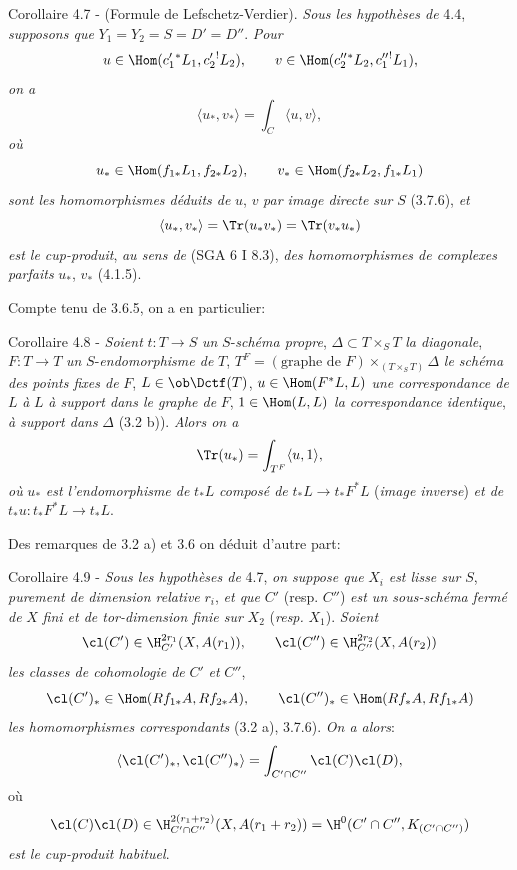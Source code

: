 \begin{statement}{Corollaire 4.7 - (Formule de Lefschetz-Verdier).}
\emph{Sous les hypothèses de} 4.4, \emph{supposons que} $Y_1=Y_2=S=D'=D''$. \emph{Pour}
\[
u\in\Hom(c_1'{}^*L_1,c_2'{}^!L_2),\qquad
v\in\Hom(c_2''{}^*L_2,c_1''{}^!L_1),
\]
\emph{on a}
\begin{equation}
\tag{4.7.1}
\langle u_*,v_*\rangle=\int_C\langle u,v\rangle,
\end{equation}
\emph{où}
\[
u_*\in\Hom(f_{1*}L_1,f_{2*}L_2),\qquad
v_*\in\Hom(f_{2*}L_2,f_{1*}L_1)
\]
\emph{sont les homomorphismes déduits de} $u$, $v$ \emph{par image directe sur} $S$ (3.7.6), \emph{et}
\[
\langle u_*,v_*\rangle=\Tr(u_*v_*)=\Tr(v_*u_*)
\]
\emph{est le cup-produit}, \emph{au sens de} (SGA 6 I 8.3), \emph{des homomorphismes de complexes parfaits} $u_*$, $v_*$ (4.1.5).
\end{statement}

Compte tenu de 3.6.5, on a en particulier:

\begin{statement}{Corollaire 4.8 -}
\emph{Soient} $t:T\longrightarrow S$ \emph{un} $S$-\emph{schéma propre}, $\Delta\subset T\times_S T$ \emph{la diagonale}, $F:T\longrightarrow T$ \emph{un} $S$-\emph{endomorphisme de} $T$, $T^F=(\text{graphe de }F)\times_{(T\times_S T)}\Delta$ \emph{le schéma des points fixes de} $F$, $L\in\ob\Dctf(T)$, $u\in\Hom(F^*L,L)$ \emph{une correspondance de} $L$ \emph{à} $L$ \emph{à support dans le graphe de} $F$, $1\in\Hom(L,L)$ \emph{la correspondance identique}, \emph{à support dans} $\Delta$ (3.2 b)). \emph{Alors on a}
\[
\Tr(u_*)=\int_{T^F}\langle u,1\rangle,
\]
\emph{où} $u_*$ \emph{est l'endomorphisme de} $t_*L$ \emph{composé de} $t_*L\longrightarrow t_*F^*L$ (\emph{image inverse}) \emph{et de} $t_*u:t_*F^*L\longrightarrow t_*L$.
\end{statement}

Des remarques de 3.2 a) et 3.6 on déduit d'autre part:

\begin{statement}{Corollaire 4.9 -}
\emph{Sous les hypothèses de} 4.7, \emph{on suppose que} $X_i$ \emph{est lisse sur} $S$, \emph{purement de dimension relative} $r_i$, \emph{et que} $C'$ (resp. $C''$) \emph{est un sous-schéma}
\emph{fermé de} $X$ \emph{fini et de tor-dimension finie sur} $X_2$ (\emph{resp.} $X_1$). \emph{Soient}
\[
\cl(C')\in \H_{C'}^{2r_1}(X,A(r_1)),\qquad
\cl(C'')\in \H_{C''}^{2r_2}(X,A(r_2))
\]
\emph{les classes de cohomologie de} $C'$ \emph{et} $C''$,
\[
\cl(C')_*\in\Hom(Rf_{1*}A,Rf_{2*}A),\qquad
\cl(C'')_*\in\Hom(Rf_*A,Rf_{1*}A)
\]
\emph{les homomorphismes correspondants} (3.2 a), 3.7.6). \emph{On a alors}:
\[
\langle \cl(C')_*,\cl(C'')_*\rangle
=
\int_{C'\cap C''}\cl(C)\cl(D),
\]
où
\[
\cl(C)\cl(D)\in
\H_{C'\cap C''}^{2(r_1+r_2)}(X,A(r_1+r_2))
=
\H^0(C'\cap C'',K_{(C'\cap C'')})
\]
\emph{est le cup-produit habituel}.
\end{statement}

